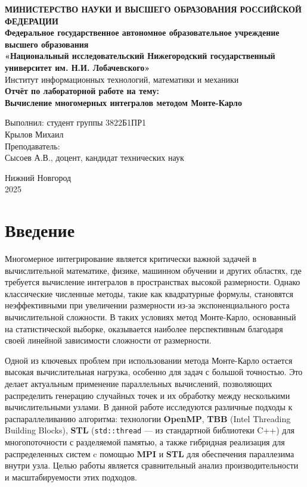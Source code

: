 \documentclass[a4paper,12pt]{article}
\begin{document}
\begin{titlepage}
\begin{center}
\textbf{МИНИСТЕРСТВО НАУКИ И ВЫСШЕГО ОБРАЗОВАНИЯ РОССИЙСКОЙ ФЕДЕРАЦИИ} \\[0.5cm]
\textbf{Федеральное государственное автономное образовательное учреждение высшего образования} \\[0.5cm]
\textbf{«Национальный исследовательский Нижегородский государственный университет им. Н.И. Лобачевского»} \\[0.5cm]
Институт информационных технологий, математики и механики \\
\vfill
{\Large
\textbf{Отчёт по лабораторной работе на тему:} \\[0.5cm]
\textbf{Вычисление многомерных интегралов методом Монте-Карло} \\
}
\vfill
\begin{flushright}
Выполнил: студент группы 3822Б1ПР1 \\
Крылов Михаил \\
\vspace{1cm}
Преподаватель: \\
Сысоев А.В., доцент, кандидат технических наук \\
\end{flushright}
\vfill
Нижний Новгород \\
2025
\end{center}
\end{titlepage}

\tableofcontents
\newpage

\section{Введение}

Многомерное интегрирование является критически важной задачей в вычислительной математике, физике, машинном обучении и других областях, где требуется вычисление интегралов в пространствах высокой размерности. Однако классические численные методы, такие как квадратурные формулы, становятся неэффективными при увеличении размерности из-за экспоненциального роста вычислительной сложности. В таких условиях метод Монте-Карло, основанный на статистической выборке, оказывается наиболее перспективным благодаря своей линейной зависимости сложности от размерности.

Одной из ключевых проблем при использовании метода Монте-Карло остается высокая вычислительная нагрузка, особенно для задач с большой точностью. Это делает актуальным применение параллельных вычислений, позволяющих распределить генерацию случайных точек и их обработку между несколькими вычислительными узлами. В данной работе исследуются различные подходы к распараллеливанию алгоритма: технологии \textbf{OpenMP}, \textbf{TBB} (Intel Threading Building Blocks), \textbf{STL} (\texttt{std::thread} — из стандартной библиотеки C++) для многопоточности с разделяемой памятью, а также гибридная реализация для распределенных систем c помощью \textbf{MPI} и \textbf{STL} для обеспечения параллезима внутри узла. Целью работы является сравнительный анализ производительности и масштабируемости этих подходов.
\end{document}
